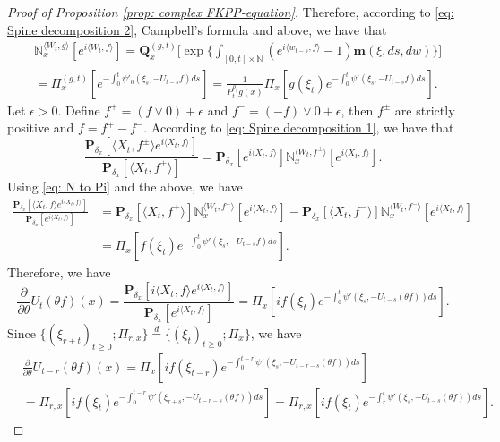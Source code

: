 \documentclass[12pt,a4paper]{amsart}
\theoremstyle{plain}
\theoremstyle{definition}
\numberwithin{equation}{section}
\begin{document}
\begin{proof}[Proof of Proposition \ref{prop: complex FKPP-equation}]
Therefore, according to \eqref{eq: Spine decomposition 2}, Campbell's formula and above, we have that
\begin{align}
  \label{eq: N to Pi}
    & \mathbb N_x^{\langle W_{t}, g\rangle}[e^{i \langle W_t, f\rangle}]
      = \mathbf Q_x^{(g,t)} \Big[\exp\Big\{\int_{[0,t]\times \mathbb N}(e^{i \langle w_{t-s}, f\rangle} - 1) \mathbf m(\xi, ds,dw)\Big\}\Big]
    \\ & = \Pi_x^{(g,t)} [e^{-\int_0^t \psi'_0(\xi_s, -U_{t-s}f)ds}]
    = \frac{1}{P_t^{\rho_1} g (x)} \Pi_x[ g(\xi_t) e^{-\int_0^t \psi'(\xi_s, -U_{t-s}f)ds} ].
\end{align}
Let $\epsilon >0$.
Define $f^+ = (f \vee 0) + \epsilon$ and $f^- = (-f) \vee 0 + \epsilon$, then $f^\pm$ are strictly positive and $f = f^+ - f^-$.
According to \eqref{eq: Spine decomposition 1}, we have that
\begin{equation}
  \frac{\mathbf P_{\delta_x}[\langle X_t,f^{\pm}\rangle e^{i \langle X_t,f\rangle}]}{\mathbf P_{\delta_x}[\langle X_t,f^{\pm}\rangle ]}
  = \mathbf P_{\delta_x}[e^{i \langle X_t,f\rangle}] \mathbb N_x^{\langle W_t,f^{\pm}\rangle}[e^{i \langle X_t,f\rangle}].
\end{equation}
Using \eqref{eq: N to Pi} and the above, we have
\begin{align}
  \frac{\mathbf P_{\delta_x}[\langle X_t, f\rangle e^{i \langle X_t, f\rangle}] }{\mathbf P_{\delta_x}[e^{i \langle X_t, f\rangle}]}
  & = \mathbf P_{\delta_x}[\langle X_t, f^+\rangle] \mathbb N_x^{\langle W_t, f^+\rangle} [e^{i \langle X_t, f\rangle}] - \mathbf P_{\delta_x}[\langle X_t, f^-\rangle]\mathbb N_x^{\langle W_t, f^-\rangle}[e^{i \langle X_t, f\rangle}]
  \\ & = \Pi_x[ f(\xi_t) e^{- \int_0^t \psi'(\xi_s, -U_{t-s}f) ds}  ].
\end{align}
Therefore, we have
\begin{equation}
  \frac{\partial}{\partial \theta} {U_t(\theta f)(x)}
  = \frac{\mathbf P_{\delta_x}[i\langle X_t, f\rangle e^{i \langle X_t, f\rangle}] }{\mathbf P_{\delta_x}[e^{i \langle X_t, f\rangle}]}
  = \Pi_x[ if(\xi_t) e^{ - \int_0^t \psi'(\xi_s, -U_{t-s}(\theta f)) ds} ].
\end{equation}
Since $\{(\xi_{r+t})_{t \geq 0}; \Pi_{r,x}\} \overset{d}{=} \{(\xi_{t})_{t\geq 0}; \Pi_{x}\} $, we have
\begin{align}
  & \frac{\partial}{\partial \theta} U_{t-r}(\theta f)( x)
    = \Pi_x[ i f(\xi_{t-r}) e^{-\int_0^{t-r} \psi'(\xi_s, -U_{t-r-s}(\theta f)) ds} ] \\
  & = \Pi_{r,x}[i f(\xi_t)e^{-\int_0^{t-r} \psi'(\xi_{r+s}, -U_{t-r-s}(\theta f)) ds} ]
    = \Pi_{r,x}[if(\xi_t)e^{-\int_r^t \psi'(\xi_{s}, -U_{t-s}(\theta f)) ds} ].
\end{align}


\end{proof}
\end{document}

